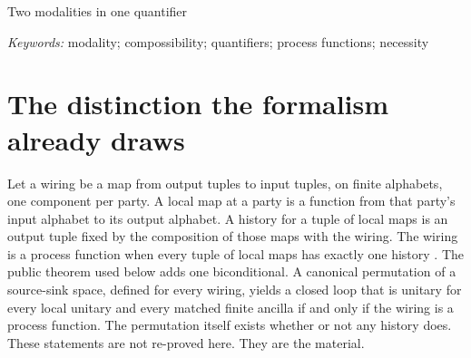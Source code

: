 \documentclass[11pt]{article}
\begin{document}
\begin{center}
{\Large Two modalities in one quantifier\par}
\vspace{0.7em}
\end{center}

\begin{abstract}
A process function is defined by a universal quantifier over local maps and an existence-and-uniqueness claim about histories. Those are different modal claims. A local map can lie in the range of the quantifier and still leave the fixed-point equation with no solution, or with two. A cyclic wiring can lie in the same range and have exactly one solution. The canonical unitary biconditional says that unitarity of one closed loop, under every local unitary and every matched finite ancilla, coincides with the history claim. That coincidence is a necessary connection inside the model. It is not a de re necessity about devices, not a free recombination of events, and not a result about grounding or monism. Counting solutions settles those numbers. It does not make any tuple actual, and it does not answer an open question about infinite maps. The argument is an alternative adaptation of a public formalism. The formalism is doing the philosophical work. No further ontology is added.
\end{abstract}

\noindent\textit{Keywords:} modality; compossibility; quantifiers; process functions; necessity

\section{The distinction the formalism already draws}
\label{sec:dist}

Let a wiring be a map from output tuples to input tuples, on finite alphabets, one component per party. A local map at a party is a function from that party's input alphabet to its output alphabet. A history for a tuple of local maps is an output tuple fixed by the composition of those maps with the wiring. The wiring is a process function when every tuple of local maps has exactly one history \citep{baumeler2016}. The public theorem used below adds one biconditional. A canonical permutation of a source-sink space, defined for every wiring, yields a closed loop that is unitary for every local unitary and every matched finite ancilla if and only if the wiring is a process function. The permutation itself exists whether or not any history does. These statements are not re-proved here. They are the material.
\end{document}

